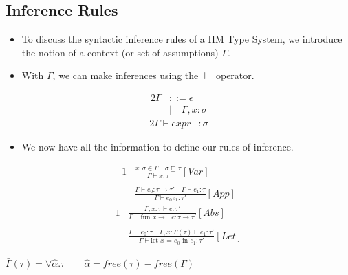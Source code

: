 \subsection{Inference Rules}
  \begin{itemize}
    \item To discuss the syntactic inference rules of a HM Type System, we introduce the notion of a context (or set of assumptions) $\Gamma$.
    \item With $\Gamma$, we can make inferences using the $\vdash$ operator.
  \end{itemize}
  \begin{alignat*}{2}
\Gamma &::= \epsilon\\
 &| \quad \Gamma, x:\sigma
\end{alignat*}
\begin{alignat*}{2}
\Gamma \vdash expr&:\sigma
\end{alignat*}
\begin{itemize}
\item We now have all the information to define our rules of inference.
  \end{itemize}
  \begin{alignat*}{1}
&\frac{x:\sigma \in \Gamma \quad \sigma\sqsubseteq\tau}{\Gamma \vdash x:\tau} [Var] \\ \\
&\frac{\Gamma \vdash e_0: \tau\rightarrow\tau' \quad \Gamma \vdash e_1:\tau}{\Gamma \vdash e_0 e_1:\tau'} [App] 
\end{alignat*}
\begin{alignat*}{1}
&\frac{\Gamma, x:\tau \vdash e:\tau'}{\Gamma \vdash \text{fun $x \rightarrow$ } e:\tau\rightarrow\tau'} [Abs] \\ \\
&\frac{\Gamma \vdash e_0: \tau \quad \Gamma, x:\bar\Gamma(\tau) \vdash e_1:\tau'}{\Gamma \vdash \text{let $x$ = } e_0 \text{ in } e_1:\tau'} [Let]
\end{alignat*}
\begin{center}
    $\bar\Gamma(\tau) = \forall \hat\alpha.\tau \quad \quad \hat\alpha=free(\tau) - free(\Gamma)$
\end{center}
  
